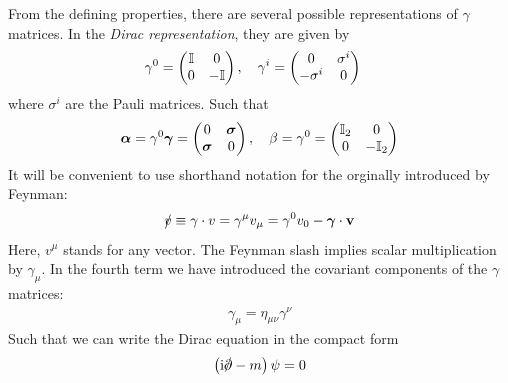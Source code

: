 From the defining properties, there are several possible representations of $\gamma$ matrices. In the \emph{Dirac representation}, they are given by
\begin{align}
    \gamma^0 &= \begin{pmatrix}
        \mathbb{I} & 0 \\
        0 & -\mathbb{I}
    \end{pmatrix}, \quad \gamma^i = \begin{pmatrix}
        0 & \sigma^i \\
        -\sigma^i & 0
    \end{pmatrix}
\end{align}
where $\sigma^i$ are the Pauli matrices. Such that 
\begin{align*}
    \boldsymbol{\alpha} = \gamma^0 \boldsymbol{\gamma} = \begin{pmatrix}
        0 & \boldsymbol{\sigma} \\
        \boldsymbol{\sigma} & 0
    \end{pmatrix}, \quad \beta = \gamma^0 = \begin{pmatrix}
        \mathbb{I}_2 & 0 \\
        0 & - \mathbb{I}_2
    \end{pmatrix}
\end{align*}
It will be convenient to use shorthand notation for the orginally introduced by Feynman: 
\begin{align*}
    \slashed{v} \equiv \gamma \cdot v = \gamma^ \mu v_ \mu = \gamma^0 v_0 - \boldsymbol{\gamma} \cdot \mathbf{v}
\end{align*}
Here, $v^ \mu$ stands for any vector. The Feynman slash implies scalar multiplication by $\gamma_ \mu$. In the fourth term we have introduced the covariant components of the $\gamma$ matrices: 
\begin{align*}
    \gamma_ \mu = \eta_{\mu \nu} \gamma^ \nu
\end{align*}
Such that we can write the Dirac equation in the compact form
\begin{align}
    \left(\ii \slashed{\pp} - m\right) \psi = 0 \label{eq:Dirac_equation}
\end{align}
 

